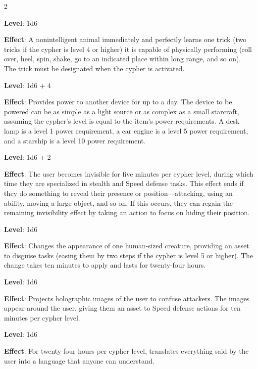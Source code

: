 \begin{multicols}{2}

\textbf{Level}: 1d6 

\textbf{Effect}: A nonintelligent animal immediately and perfectly learns one trick (two tricks if the cypher is level 4 or higher) it is capable of physically performing (roll over, heel, spin, shake, go to an indicated place within long range, and so on). The trick must be designated when the cypher is activated.


\textbf{Level}: 1d6 + 4

\textbf{Effect}: Provides power to another device for up to a day. The device to be powered
can be as simple as a light source or as complex as a small starcraft, assuming the cypher’s level is equal to the item’s power
requirements. A desk lamp is a level 1 power requirement, a car engine is a level
5 power requirement, and a starship is a level 10 power requirement.


\textbf{Level}: 1d6 + 2

\textbf{Effect}: The user becomes invisible for five minutes per cypher level, during which time they are specialized in stealth and Speed defense tasks. This effect ends if they do something to reveal their presence or position—attacking, using an ability, moving a large object, and so on. If this occurs, they can regain the remaining invisibility effect by taking an action to focus on hiding their position.


\textbf{Level}: 1d6

\textbf{Effect}: Changes the appearance of one human-sized creature, providing an asset to disguise tasks (easing them by two steps if the cypher is level 5 or higher). The change takes ten minutes to apply and lasts for twenty-four hours.


\textbf{Level}: 1d6

\textbf{Effect}: Projects holographic images of the user to confuse attackers. The images appear around the user, giving them an asset to Speed defense actions for ten minutes per cypher level.


\textbf{Level}: 1d6

\textbf{Effect}: For twenty-four hours per cypher level, translates everything said by the user into a language that anyone can understand.


\end{multicols}
